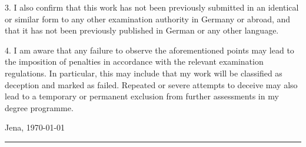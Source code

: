\documentclass[hidelinks,11pt]{article}
\begin{document}
3. I also confirm that this work has not been previously submitted in an identical or similar form to
any other examination authority in Germany or abroad, and that it has not been previously
published in German or any other language.

4. I am aware that any failure to observe the aforementioned points may lead to the imposition of
penalties in accordance with the relevant examination regulations. In particular, this may include
that my work will be classified as deception and marked as failed. Repeated or severe attempts to
deceive may also lead to a temporary or permanent exclusion from further assessments in my
degree programme.


\noindent Jena, \today \hfill \par
\raggedleft
\parbox[H]{.5\linewidth}{
	\rule[-3pt]{\linewidth}{.4pt}
	\par
	\smallskip  
	}
\end{document}

